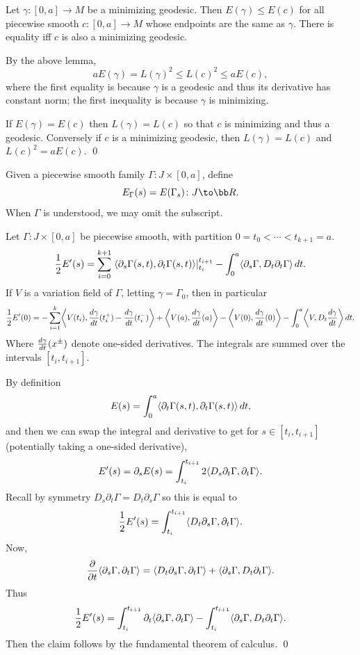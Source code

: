     Let $\gamma\colon[0,a]\to M$ be a minimizing geodesic.
    Then $E(\gamma)\leq E(c)$ for all piecewise smooth $c\colon[0,a]\to M$ whose endpoints are the same as $\gamma$.
    There is equality iff $c$ is also a minimizing geodesic.

\elemm

\bproof

    By the above lemma,
    $$ aE(\gamma) = L(\gamma)^2 \leq L(c)^2 \leq aE(c) , $$
    where the first equality is because $\gamma$ is a geodesic and thus its derivative has constant norm; the first
    inequality is because $\gamma$ is minimizing.

    If $E(\gamma)=E(c)$ then $L(\gamma)=L(c)$ so that $c$ is minimizing and thus a geodesic.
    Conversely if $c$ is a minimizing geodesic, then $L(\gamma)=L(c)$ and $L(c)^2=aE(c)$.
    \qed

\eproof

Given a piecewise smooth family $\Gamma\colon J\times[0,a]$, define
$$ E_\Gamma(s) = E(\Gamma_s) \colon J \to \bR . $$
When $\Gamma$ is understood, we may omit the subscript.

\blemm

    Let $\Gamma\colon J\times[0,a]$ be piecewise smooth, with partition $0=t_0<\cdots<t_{k+1}=a$.
    $$ {{1}\over{2}}E'(s) = \sum_{i=0}^{k+1}\left.\mathopen{}\mathclose{\left<\partial_s\Gamma(s,t),\partial_t\Gamma(s,t)\right>}\right|^{t_{i+1}}_{t_i}
    - \int_0^a\mathopen{}\mathclose{\left<\partial_s\Gamma,D_t\partial_t\Gamma\right>}\mathop{}\!d t . $$
    If $V$ is a variation field of $\Gamma$, letting $\gamma=\Gamma_0$, then in particular
    $$ {{1}\over{2}}E'(0) = -\sum_{i=1}^k\mathopen{}\mathclose{\left<V(t_i),{{d\gamma}\over{dt}}(t_i^+)-{{d\gamma}\over{dt}}(t_i^-)\right>}
    + \mathopen{}\mathclose{\left<V(a),{{d\gamma}\over{dt}}(a)\right>} - \mathopen{}\mathclose{\left<V(0),{{d\gamma}\over{dt}}(0)\right>} - \int_0^a\mathopen{}\mathclose{\left<V,D_t{{d\gamma}\over{dt}}\right>}\,dt . $$
    Where ${{d\gamma}\over{dt}}(x^\pm)$ denote one-sided derivatives.
    The integrals are summed over the intervals $[t_i,t_{i+1}]$.

\elemm

\bproof

    By definition
    $$ E(s) = \int_0^a\mathopen{}\mathclose{\left<\partial_t\Gamma(s,t),\partial_t\Gamma(s,t)\right>}\mathop{}\!d t , $$
    and then we can swap the integral and derivative to get for $s\in[t_i,t_{i+1}]$ (potentially taking a one-sided
    derivative),
    $$ E'(s) = \partial_s E(s) = \int_{t_i}^{t_{i+1}}2\mathopen{}\mathclose{\left<D_s\partial_t\Gamma,\partial_t\Gamma\right>} . $$
    Recall by symmetry $D_s\partial_t\Gamma=D_t\partial_s\Gamma$ so this is equal to
    $$ {{1}\over{2}}E'(s) = \int_{t_i}^{t_{i+1}}\mathopen{}\mathclose{\left<D_t\partial_s\Gamma,\partial_t\Gamma\right>} . $$
    Now,
    $$ {{\partial }\over{\partial t}}\mathopen{}\mathclose{\left<\partial_s\Gamma,\partial_t\Gamma\right>} = \mathopen{}\mathclose{\left<D_t\partial_s\Gamma,\partial_t\Gamma\right>}
    + \mathopen{}\mathclose{\left<\partial_s\Gamma,D_t\partial_t\Gamma\right>} . $$
    Thus
    $$ {{1}\over{2}}E'(s) = \int_{t_i}^{t_{i+1}}\partial_t\mathopen{}\mathclose{\left<\partial_s\Gamma,\partial_t\Gamma\right>}
    - \int_{t_i}^{t_{i+1}}\mathopen{}\mathclose{\left<\partial_s\Gamma,D_t\partial_t\Gamma\right>} . $$
    Then the claim follows by the fundamental theorem of calculus.
    \qed

